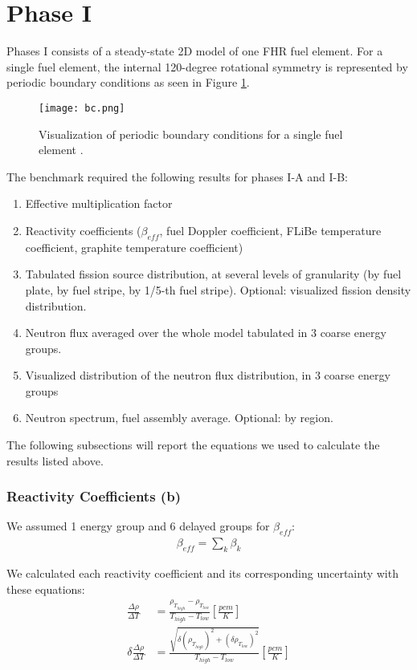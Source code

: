 \section{Phase I}
\label{sec:phase1}
Phases I consists of a steady-state 2D model of one \gls{FHR} fuel element. 
For a single fuel element, the internal 120-degree rotational symmetry is 
represented by periodic boundary conditions as seen in Figure \ref{fig:bc}. 
\begin{figure}[]
    \centering
    \texttt{[image: bc.png]} 
    \caption{Visualization of periodic boundary conditions for a single fuel 
    element \cite{noauthor_fluoride_nodate}.}
    \label{fig:bc}
\end{figure}
The benchmark required the following results for phases I-A and I-B:
\begin{enumerate}[label=(\alph*)]
    \item Effective multiplication factor 
    \item Reactivity coefficients ($\beta_{eff}$, fuel Doppler coefficient, FLiBe 
    temperature coefficient, graphite temperature coefficient)
    \item Tabulated fission source distribution, at several levels of granularity 
    (by fuel plate, by fuel stripe, by 1/5-th fuel stripe). Optional: visualized fission 
    density distribution.
    \item Neutron flux averaged over the whole model tabulated in 3 coarse energy groups. 
    \item Visualized distribution of the neutron flux distribution, in 3 coarse energy groups
    \item Neutron spectrum, fuel assembly average. Optional: by region.
\end{enumerate}

The following subsections will report the equations we used to calculate the
results listed above. 

\subsubsection{Reactivity Coefficients (b)}
We assumed 1 energy group and 6 delayed groups for $\beta_{eff}$: 
\begin{align}
    \beta_{eff} = \sum_k \beta_k
\end{align}

We calculated each reactivity coefficient and its corresponding uncertainty 
with these equations: 
\begin{align}
    \frac{\Delta \rho}{\Delta T} &= 
    \frac{\rho_{T_{high}}-\rho_{T_{low}}}{T_{high}-T_{low}} [\frac{pcm}{K}] \\
    \delta \frac{\Delta \rho}{\Delta T} &= 
    \frac{\sqrt{\delta (\rho_{T_{high}})^2+(\delta \rho_{T_{low}})^2}}{T_{high}-T_{low}} [\frac{pcm}{K}] 
\end{align}

